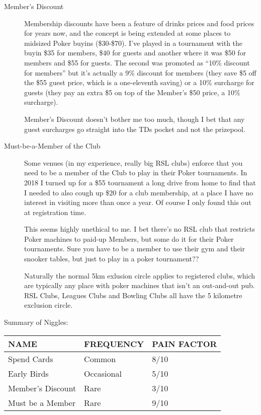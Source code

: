 \begin{description}
\item[Member's Discount] Membership discounts have been a feature
of drinks prices and food prices for years now, and the concept
is being extended at some places to midsized Poker buyins
(\$30-\$70). I've played in a tournament with the buyin 
\$35 for members, \$40 for guests and another where it was \$50
for members and \$55 for guests. The second was promoted as ``10\%
discount for members'' but it's actually a 9\% discount for members
(they save \$5 off the \$55 guest price, which is a one-eleventh saving)
or a 10\% surcharge for guests (they pay an extra \$5 on top of the
Member's \$50 price, a 10\% surcharge).

Member's Discount doesn't bother me too much, though I bet that
any guest surcharges go straight into the TDs pocket and not the prizepool.

\item[Must-be-a-Member of the Club] Some venues (in my experience,
really big RSL clubs) enforce that you need to be a member of the Club
to play in their Poker tournaments. In 2018 I turned up for a \$55
tournament a long drive from home to find that I needed to also cough
up \$20 for a club membership, at a place I have no interest in visiting
more than once a year. Of course I only found this out at registration
time.

This seems highly unethical to me. I bet there's no RSL club that
restricts Poker machines to paid-up Members, but some do it for
their Poker tournaments. Sure you have to be a member to use
their gym and their snooker tables, but just to play
in a poker tournament??

Naturally the normal 5km exlusion circle applies to registered clubs,
which are typically any place with poker machines that isn't an 
out-and-out pub. RSL Clubs, Leagues Clubs and Bowling Clubs all have
the 5 kilometre exclusion circle.

\end{description}

Summary of Niggles:

\begin{tabular}{|l|l|l|} \hline
NAME    &  FREQUENCY  & PAIN FACTOR\\ \hline
Spend Cards & Common  & 8/10\\ \hline
Early Birds & Occasional & 5/10\\ \hline
Member's Discount & Rare  & 3/10\\ \hline
Must be a Member & Rare  & 9/10\\ \hline
\end{tabular}

